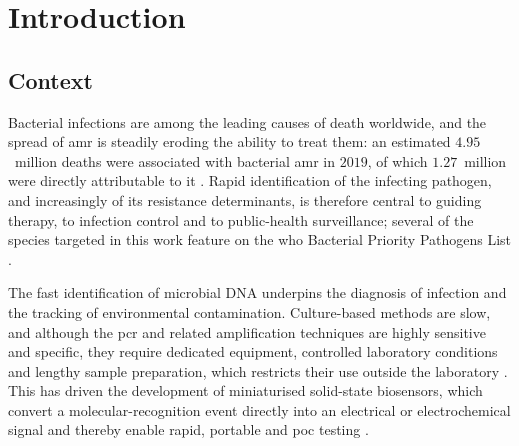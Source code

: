 
\chapter{Introduction}

\section{Context}

Bacterial infections are among the leading causes of death worldwide, and the spread of \acrfull{amr}
is steadily eroding the ability to treat them: an estimated $4.95$~million deaths were associated with
bacterial \acrshort{amr} in $2019$, of which $1.27$~million were directly attributable to it
\citep{murray2022}. Rapid identification of the infecting pathogen, and increasingly of its resistance
determinants, is therefore central to guiding therapy, to infection control and to public-health
surveillance; several of the species targeted in this work feature on the \acrshort{who} Bacterial Priority
Pathogens List \citep{who2024bppl}.

The fast identification of microbial DNA underpins the diagnosis of infection and the tracking of
environmental contamination. Culture-based methods are slow, and although the \acrfull{pcr} and related
amplification techniques are highly sensitive and specific, they require dedicated equipment, controlled
laboratory conditions and lengthy sample preparation, which restricts their use outside the laboratory
\citep{hu2024}. This has driven the development of miniaturised solid-state biosensors, which convert a
molecular-recognition event directly into an electrical or electrochemical signal and thereby enable rapid,
portable and \acrfull{poc} testing \citep{kozel2017,krishnan2023}.


